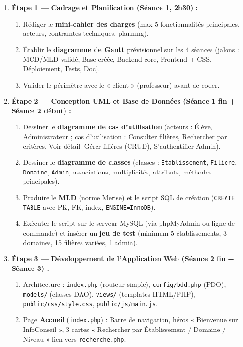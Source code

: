 \documentclass[11pt]{article}
\begin{document}
\begin{enumerate}
    \item \textbf{Étape 1 — Cadrage et Planification (Séance 1, 2h30) :}
    \begin{enumerate}
        \item Rédiger le \textbf{mini-cahier des charges} (max 5 fonctionnalités principales, acteurs, contraintes techniques, planning).
        \item Établir le \textbf{diagramme de Gantt} prévisionnel sur les 4 séances (jalons : MCD/MLD validé, Base créée, Backend core, Frontend + CSS, Déploiement, Tests, Doc).
        \item Valider le périmètre avec le « client » (professeur) avant de coder.
    \end{enumerate}
    \item \textbf{Étape 2 — Conception UML et Base de Données (Séance 1 fin + Séance 2 début) :}
    \begin{enumerate}
        \item Dessiner le \textbf{diagramme de cas d'utilisation} (acteurs : Élève, Administrateur ; cas d'utilisation : Consulter filières, Rechercher par critères, Voir détail, Gérer filières (CRUD), S'authentifier Admin).
        \item Dessiner le \textbf{diagramme de classes} (classes : \texttt{Etablissement}, \texttt{Filiere}, \texttt{Domaine}, \texttt{Admin}, associations, multiplicités, attributs, méthodes principales).
        \item Produire le \textbf{MLD} (norme Merise) et le script SQL de création (\texttt{CREATE TABLE} avec PK, FK, index, \texttt{ENGINE=InnoDB}).
        \item Exécuter le script sur le serveur MySQL (via phpMyAdmin ou ligne de commande) et insérer un \textbf{jeu de test} (minimum 5 établissements, 3 domaines, 15 filières variées, 1 admin).
    \end{enumerate}
    \item \textbf{Étape 3 — Développement de l'Application Web (Séance 2 fin + Séance 3) :}
    \begin{enumerate}
        \item Architecture : \texttt{index.php} (routeur simple), \texttt{config/bdd.php} (PDO), \texttt{models/} (classes DAO), \texttt{views/} (templates HTML/PHP), \texttt{public/css/style.css}, \texttt{public/js/main.js}.
        \item Page \textbf{Accueil} (\texttt{index.php}) : Barre de navigation, héros « Bienvenue sur InfoConseil », 3 cartes « Rechercher par Établissement / Domaine / Niveau » lien vers \texttt{recherche.php}.

\end{enumerate}
\end{enumerate}
\end{document}
